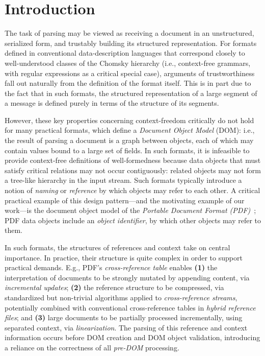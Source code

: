 \section{Introduction}
\label{sec:intro}
The task of parsing may be viewed as receiving a document in an
unstructured, serialized form, and trustably building its structured
representation.
%
For formats defined in conventional data-description languages that
correspond closely to well-understood classes of the Chomsky hierarchy
(i.e., context-free grammars, with regular expressions as a critical
special case), arguments of trustworthiness fall out naturally from
the definition of the format itself.
%
This is in part due to the fact that in such formats, the structured
representation of a large segment of a message is defined purely in
terms of the structure of its segments.

However, these key properties concerning context-freedom critically do
not hold for many practical formats, which define a \emph{Document
  Object Model} (DOM): i.e., the result of parsing a document is a
graph between objects, each of which may contain values bound to a
large set of fields.
%
In such formats, it is infeasible to provide context-free definitions
of well-formedness because data objects that must satisfy critical
relations may not occur contiguously: related objects may not form a
tree-like hierarchy in the input stream.
%
Such formats typically introduce a notion of \emph{naming} or
\emph{reference} by which objects may refer to each other.
%
A critical practical example of this design pattern---and the
motivating example of our work---is the document object model of the
\emph{Portable Document Format (PDF)}~\cite{isotc171sc2wg8ISO32000220202020};
%
PDF data objects include an \emph{object identifier}, by which other
objects may refer to them.

In such formats, the structures of references and context take on
central importance.
%
In practice, their structure is quite complex in order to support
practical demands.
%
E.g., PDF's \emph{cross-reference table} enables
% 
\textbf{(1)} the interpretation of documents to be strongly mutated by
appending content, via \emph{incremental updates};
%
\textbf{(2)} the reference structure to be compressed, via
standardized but non-trivial algorithms applied to
\emph{cross-reference streams}, potentially combined with conventional
cross-reference tables in \emph{hybrid reference files}; and
% 
\textbf{(3)} large documents to be partially processed incrementally,
using separated context, via \emph{linearization}.
%
The parsing of this reference and context information occurs before
DOM creation and DOM object validation, introducing a reliance on the
correctness of all \emph{pre-DOM} processing.

